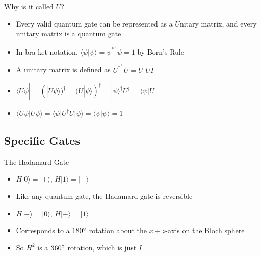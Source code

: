 \documentclass[aspectratio=169, handout]{beamer}
\begin{document}
\begin{frame}{Why is it called $U$?}
    \begin{itemize}
        \item Every valid quantum gate can be represented as a $U$nitary matrix, and every unitary matrix is a quantum gate \pause
        \item In bra-ket notation, $\langle\psi|\psi\rangle=\psi^{*^\intercal}\psi=1$ by Born's Rule \pause
        \item A unitary matrix is defined as $U^{*^\intercal}U=U^{\dagger}UI$ \pause 
        \item $\langle U\psi|=(|U\psi\rangle)^{\dagger}=(U|\psi\rangle)^{\dagger}=|\psi\rangle^{\dagger}U^{\dagger}=\langle\psi|U^{\dagger}$ \pause
        \item $\langle U\psi|U\psi\rangle=\langle\psi|U^{\dagger}U|\psi\rangle=\langle\psi|\psi\rangle=1$
    \end{itemize}
\end{frame}

\subsection{Specific Gates}
\frame{\subsectionpage}

\begin{frame}{The Hadamard Gate}
    \begin{itemize}
        \item $H|0\rangle = |+\rangle$, $H|1\rangle = |-\rangle$ \pause
        \item Like any quantum gate, the Hadamard gate is reversible \pause
        \item $H|+\rangle = |0\rangle$, $H|-\rangle = |1\rangle$ \pause
        \item Corresponds to a $180\degree$ rotation about the $x+z$-axis on the Bloch sphere \pause
        \item So $H^2$ is a $360\degree$ rotation, which is just $I$
    \end{itemize}
\end{frame}
\end{document}
